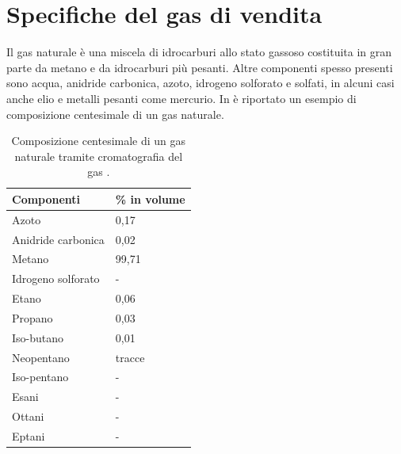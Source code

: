 \section{Specifiche del gas di vendita}
Il gas naturale è una miscela di idrocarburi allo stato gassoso costituita in gran parte da metano e da idrocarburi più pesanti. Altre componenti spesso presenti sono acqua, anidride carbonica, azoto, idrogeno solforato e solfati, in alcuni casi anche elio e metalli pesanti come mercurio. In  è riportato un esempio di composizione centesimale di un gas naturale. 

\begin{table}[htbp]
    \small
    \centering
    \caption{Composizione centesimale di un gas naturale tramite cromatografia del gas \parencite{mele2012produzione}.}
    \label{tab:ng-composition}
    \begin{tabular}{p{}p{}}
        \hline
        {\bf Componenti}                & {\textbf{\% in volume}}       \\ \hline
        Azoto                           & {0,17}                        \\
        Anidride carbonica              & {0,02}                        \\
        Metano                          & {99,71}                       \\
        Idrogeno solforato              & {-}                           \\
        Etano                           & {0,06}                        \\
        Propano                         & {0,03}                        \\
        Iso-butano                      & {0,01}                        \\
        Neopentano                      & tracce                        \\
        Iso-pentano                     & -                             \\
        Esani                           & -                             \\
        Ottani                          & -                             \\
        Eptani                          & -                             \\ \hline
    \end{tabular}
\end{table}

